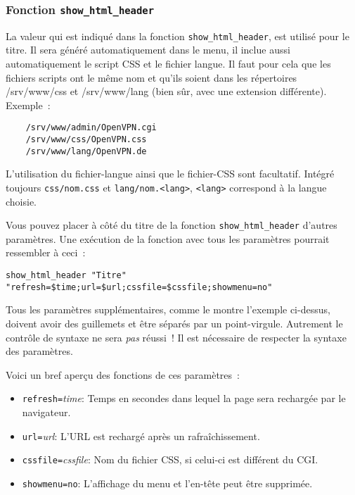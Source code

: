 \subsubsection{Fonction \texttt{show\_html\_header}}

La valeur qui est indiqué dans la fonction \texttt{show\_html\_header}, est utilisé
pour le titre. Il sera généré automatiquement dans le menu, il inclue aussi
automatiquement le script CSS et le fichier langue. Il faut pour cela que les
fichiers scripts ont le même nom et qu’ils soient dans les répertoires
/srv/www/css et /srv/www/lang (bien sûr, avec une extension différente).
Exemple~:

\begin{example}
\begin{verbatim}
    /srv/www/admin/OpenVPN.cgi
    /srv/www/css/OpenVPN.css
    /srv/www/lang/OpenVPN.de
\end{verbatim}
\end{example}

L'utilisation du fichier-langue ainsi que le fichier-CSS sont facultatif.
Intégré toujours \texttt{css/nom.css} et \texttt{lang/nom.<lang>}, \texttt{<lang>} correspond à la langue
choisie.

Vous pouvez placer à côté du titre de la fonction \texttt{show\_html\_header} d'autres
paramètres. Une exécution de la fonction avec tous les paramètres pourrait
ressembler à ceci~:

\begin{example}
\begin{verbatim}
show_html_header "Titre" "refresh=$time;url=$url;cssfile=$cssfile;showmenu=no"
\end{verbatim}
\end{example}

Tous les paramètres supplémentaires, comme le montre l'exemple ci-dessus,
doivent avoir des guillemets et être séparés par un point-virgule. Autrement
le contrôle de syntaxe ne sera \emph{pas} réussi~! Il est nécessaire de respecter la
syntaxe des paramètres.

Voici un bref aperçu des fonctions de ces paramètres~:

\begin{itemize}
 \item \texttt{refresh=}\emph{time}: Temps en secondes dans lequel la page sera rechargée par le navigateur.
 \item \texttt{url=}\emph{url}: L'URL est rechargé après un rafraîchissement.
 \item \texttt{cssfile=}\emph{cssfile}: Nom du fichier CSS, si celui-ci est différent du CGI.
 \item \texttt{showmenu=no}: L'affichage du menu et l'en-tête peut être supprimée.
\end{itemize}

